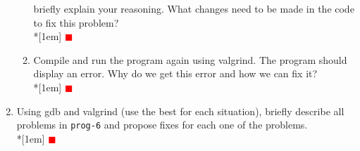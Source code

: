 \documentclass[12pt]{article}
\newcounter{problem}
\newcommand{\TODO}{\textcolor{red}{$\blacksquare$}}
\begin{document}
\begin{enumerate}
\begin{enumerate}
  briefly explain your reasoning. What changes need to be made in the code to
  fix this problem?\\*[1em]
  \TODO
\item Compile and run the program again using valgrind. The program should
  display an error. Why do we get this error and how we can fix it?\\*[1em]
  \TODO
\end{enumerate}
\item Using gdb and valgrind (use the best for each situation), briefly describe
  all problems in \texttt{prog-6} and propose fixes for each one of the
  problems.\\*[1em]
  \TODO
\end{enumerate}
\end{document}
